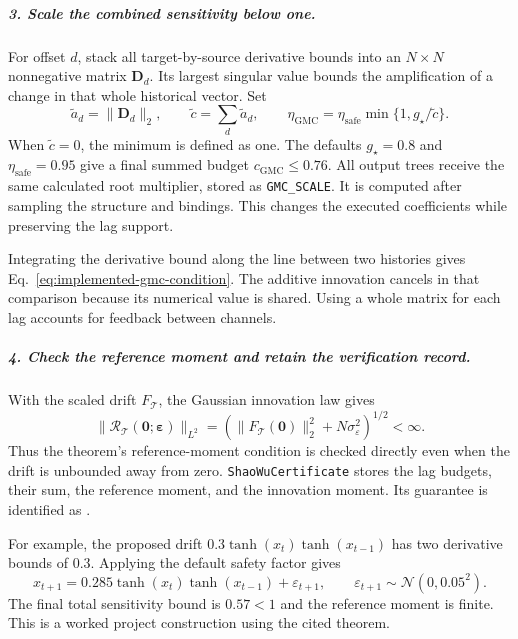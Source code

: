\subparagraph{3. Scale the combined sensitivity below one.}
For offset $d$, stack all target-by-source derivative bounds into an
$N\times N$ nonnegative matrix $\mathbf D_d$. Its largest singular value
bounds the amplification of a change in that whole historical vector.
Set
\begin{equation}
 \widetilde a_d=\|\mathbf D_d\|_2,\qquad
 \widetilde c=\sum_d\widetilde a_d,\qquad
 \eta_{\mathrm{GMC}}=
 \eta_{\mathrm{safe}}\min\{1,g_\star/\widetilde c\}.
 \label{eq:implemented-gmc-scaling}
\end{equation}
When $\widetilde c=0$, the minimum is defined as one. The defaults
$g_\star=0.8$ and $\eta_{\mathrm{safe}}=0.95$ give a final summed budget
$c_{\mathrm{GMC}}\leq0.76$. All output trees receive the same calculated
root multiplier, stored as \texttt{GMC\_SCALE}. It is computed after
sampling the structure and bindings. This changes the executed
coefficients while preserving the lag support.

Integrating the derivative bound along the line between two histories
gives Eq.~\eqref{eq:implemented-gmc-condition}. The additive innovation
cancels in that comparison because its numerical value is shared.
Using a whole matrix for each lag accounts for feedback between channels.

\subparagraph{4. Check the reference moment and retain the verification record.}
With the scaled drift $F_{\mathcal T}$, the Gaussian innovation law gives
\begin{equation}
 \|\mathcal R_{\mathcal T}(\mathbf0;\boldsymbol\varepsilon)\|_{L^2}
 =\left(\|F_{\mathcal T}(\mathbf0)\|_2^2+
                   N\sigma_\varepsilon^2\right)^{1/2}<\infty.
 \label{eq:implemented-gmc-anchor}
\end{equation}
Thus the theorem's reference-moment condition is checked directly even
when the drift is unbounded away from zero.
\texttt{ShaoWuCertificate} stores the lag budgets, their sum, the reference
moment, and the innovation moment. Its guarantee is identified as
.

For example, the proposed drift $0.3\tanh(x_t)\tanh(x_{t-1})$ has two
derivative bounds of $0.3$. Applying the default safety factor gives
\begin{equation}
 x_{t+1}=0.285\tanh(x_t)\tanh(x_{t-1})+\varepsilon_{t+1},
 \qquad \varepsilon_{t+1}\sim\mathcal N(0,0.05^2).
 \label{eq:implemented-gmc-example}
\end{equation}
The final total sensitivity bound is $0.57<1$ and the reference moment is
finite. This is a worked project construction using the cited theorem.

